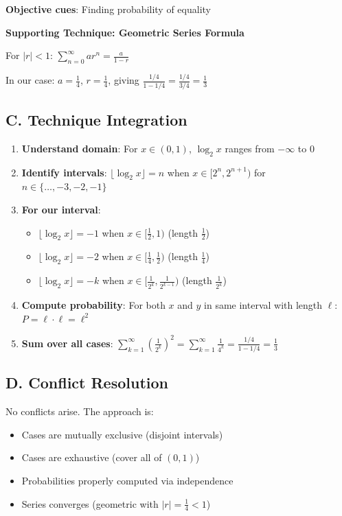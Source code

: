 \documentclass[11pt]{article}
\begin{document}
\begin{techniquesbox}
\textbf{Objective cues}: Finding probability of equality

\textbf{Supporting Technique: Geometric Series Formula}

For $|r| < 1$: $\sum_{n=0}^{\infty} ar^n = \frac{a}{1-r}$

In our case: $a = \frac{1}{4}$, $r = \frac{1}{4}$, giving $\frac{1/4}{1-1/4} = \frac{1/4}{3/4} = \frac{1}{3}$

\subsection*{C. Technique Integration}
\begin{enumerate}
    \item \textbf{Understand domain}: For $x \in (0,1)$, $\log_2 x$ ranges from $-\infty$ to $0$
    \item \textbf{Identify intervals}: $\lfloor\log_2 x\rfloor = n$ when $x \in [2^n, 2^{n+1})$ for $n \in \{\ldots, -3, -2, -1\}$
    \item \textbf{For our interval}: 
    \begin{itemize}
        \item $\lfloor\log_2 x\rfloor = -1$ when $x \in [\frac{1}{2}, 1)$ (length $\frac{1}{2}$)
        \item $\lfloor\log_2 x\rfloor = -2$ when $x \in [\frac{1}{4}, \frac{1}{2})$ (length $\frac{1}{4}$)
        \item $\lfloor\log_2 x\rfloor = -k$ when $x \in [\frac{1}{2^k}, \frac{1}{2^{k-1}})$ (length $\frac{1}{2^k}$)
    \end{itemize}
    \item \textbf{Compute probability}: For both $x$ and $y$ in same interval with length $\ell$: $P = \ell \cdot \ell = \ell^2$
    \item \textbf{Sum over all cases}: $\sum_{k=1}^{\infty} (\frac{1}{2^k})^2 = \sum_{k=1}^{\infty} \frac{1}{4^k} = \frac{1/4}{1-1/4} = \frac{1}{3}$
\end{enumerate}

\subsection*{D. Conflict Resolution}
No conflicts arise. The approach is:
\begin{itemize}[leftmargin=*]
    \item Cases are mutually exclusive (disjoint intervals)
    \item Cases are exhaustive (cover all of $(0,1)$)
    \item Probabilities properly computed via independence
    \item Series converges (geometric with $|r| = \frac{1}{4} < 1$)
\end{itemize}
\end{techniquesbox}
\end{document}
